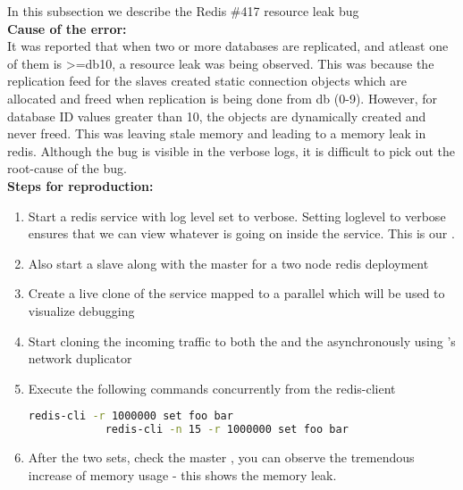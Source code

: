 In this subsection we describe the Redis \#417 resource leak bug \\

\noindent \textbf{Cause of the error:} \\

It was reported that when two or more databases are replicated, and atleast one of them is \textgreater=db10, a resource leak was being observed. This was because the replication feed for the slaves created static connection objects which are allocated and freed when replication is being done from db (0-9). However, for database ID values greater than 10, the objects are dynamically created and never freed.
This was leaving stale memory and leading to a memory leak in redis.
Although the bug is visible in the verbose logs, it is difficult to pick out the root-cause of the bug.\\

\noindent \textbf{Steps for reproduction:} \\

\begin{adjustwidth}{0.5cm}{}
	\begin{enumerate}
		\item Start a redis service with log level set to verbose. Setting loglevel to verbose ensures that we can view whatever is going on inside the service. This is our \productioncontainer.
		\item Also start a slave along with the master for a two node redis deployment
		\item Create a live clone of the service mapped to a parallel \debugcontainer which will be used to visualize debugging
		\item Start cloning the incoming traffic to both the \productioncontainer and the \debugcontainer asynchronously using \parikshan's network duplicator
		
		\item Execute the following commands concurrently from the redis-client
		
		\begin{lstlisting}[language=sh]
			redis-cli -r 1000000 set foo bar
			redis-cli -n 15 -r 1000000 set foo bar
		\end{lstlisting}
		
		\item After the two sets, check the master \debugcontainer, you can observe the tremendous increase of memory usage - this shows the memory leak.
		
	\end{enumerate}
\end{adjustwidth}

